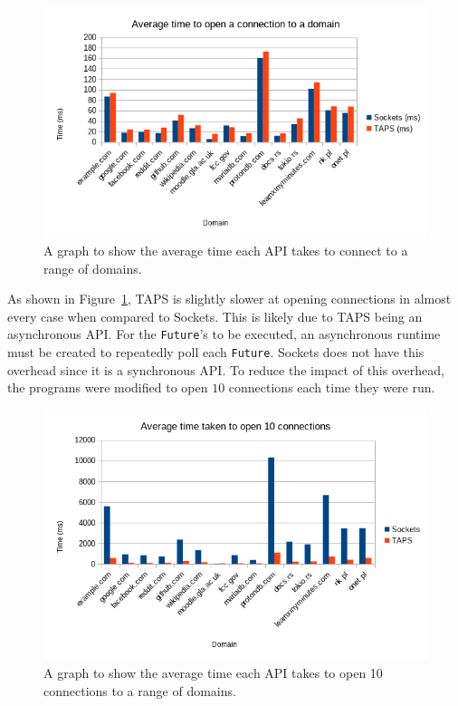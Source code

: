 \begin{figure}[h]
    \includegraphics[width=\textwidth]{../data/processed/avg_latency}
    \caption{A graph to show the average time each API takes to connect to a range of domains.}
    \label{fig:latency}
\end{figure}

As shown in Figure~\ref{fig:latency}, TAPS is slightly slower at opening connections in almost every case when compared
to Sockets.
This is likely due to TAPS being an asynchronous API.
For the \texttt{Future}'s to be executed, an asynchronous runtime must be created to repeatedly poll each
\texttt{Future}.
Sockets does not have this overhead since it is a synchronous API.
To reduce the impact of this overhead, the programs were modified to open \(10\) connections each time they were run.

\begin{figure}[h]
    \includegraphics[width=\textwidth]{../data/processed/avg_multi}
    \caption{A graph to show the average time each API takes to open 10 connections to a range of domains.}
    \label{fig:multiLatency}
\end{figure}

